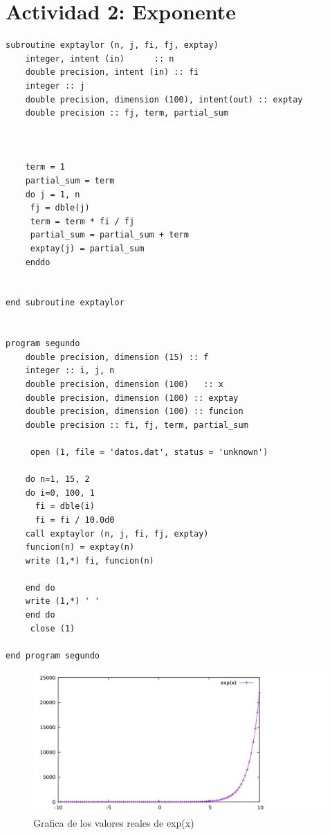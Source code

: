 \documentclass{article}
\begin{document}
\section{Actividad 2: Exponente}
\begin{verbatim}
subroutine exptaylor (n, j, fi, fj, exptay)
	integer, intent (in)      :: n
	double precision, intent (in) :: fi
	integer :: j
	double precision, dimension (100), intent(out) :: exptay
	double precision :: fj, term, partial_sum
	
	
	
	term = 1
	partial_sum = term
	do j = 1, n
	 fj = dble(j)
	 term = term * fi / fj
	 partial_sum = partial_sum + term
	 exptay(j) = partial_sum
	enddo

	 
end subroutine exptaylor
	 

program segundo
	double precision, dimension (15) :: f
	integer :: i, j, n
	double precision, dimension (100)   :: x
	double precision, dimension (100) :: exptay
	double precision, dimension (100) :: funcion
	double precision :: fi, fj, term, partial_sum

     open (1, file = 'datos.dat', status = 'unknown')
	
	do n=1, 15, 2
	do i=0, 100, 1
	  fi = dble(i)
	  fi = fi / 10.0d0
	call exptaylor (n, j, fi, fj, exptay)
	funcion(n) = exptay(n)
	write (1,*) fi, funcion(n)

	end do
	write (1,*) ' '
	end do
     close (1)

end program segundo
\end{verbatim}
\clearpage
\begin{figure}
  \includegraphics[width=\linewidth]{exponencial.png}
  \caption{Grafica de los valores reales de exp(x)}
\end{figure}
\end{document}
